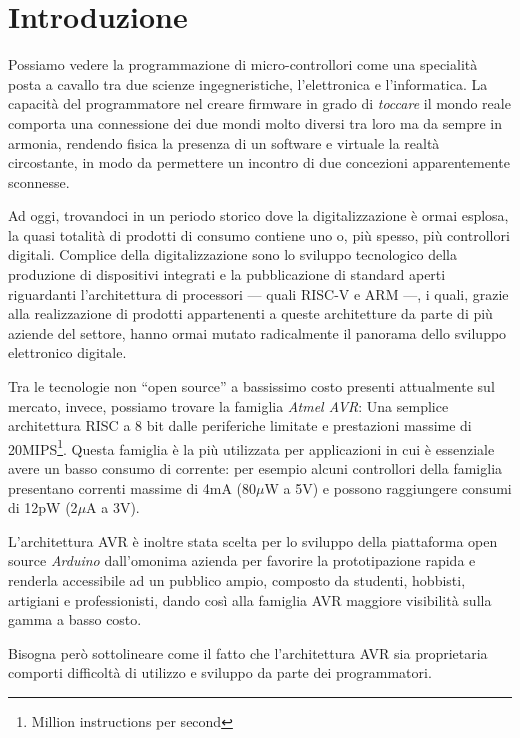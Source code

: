 \chapter{Introduzione}

Possiamo vedere la programmazione di micro-controllori come una specialità posta a cavallo tra due scienze ingegneristiche, l'elettronica e l'informatica.
La capacità del programmatore nel creare firmware in grado di \textit{toccare} il mondo reale comporta una connessione dei due mondi molto diversi tra loro ma da sempre in armonia, rendendo fisica la presenza di un software e virtuale la realtà circostante, in modo da permettere un incontro di due concezioni apparentemente sconnesse.

Ad oggi, trovandoci in un periodo storico dove la digitalizzazione è ormai esplosa, la quasi totalità di prodotti di consumo contiene uno o, più spesso, più controllori digitali.
Complice della digitalizzazione sono lo sviluppo tecnologico della produzione di dispositivi integrati e la pubblicazione di standard aperti riguardanti l'architettura di processori --- quali RISC-V e ARM\cite{site:arm-licensing} ---, i quali, grazie alla realizzazione di prodotti appartenenti a queste architetture da parte di più aziende del settore, hanno ormai mutato radicalmente il panorama dello sviluppo elettronico digitale.\cite{arm-intel-phone-market}\cite{site:arm-press-200b-chips}

Tra le tecnologie non ``open source'' a bassissimo costo presenti attualmente sul mercato, invece, possiamo trovare la famiglia \textit{Atmel AVR}: Una semplice architettura RISC a 8 bit dalle periferiche limitate e prestazioni massime di 20MIPS\footnote{Million instructions per second}.
Questa famiglia è la più utilizzata per applicazioni in cui è essenziale avere un basso consumo di corrente: per esempio alcuni controllori della famiglia presentano correnti massime di 4mA (80\(\mu\)W a 5V) e possono raggiungere consumi di 12pW (2\(\mu\)A a 3V)\cite{avr:tiny4}.

L'architettura AVR è inoltre stata scelta per lo sviluppo della piattaforma open source \textit{Arduino} dall'omonima azienda per favorire la prototipazione rapida e renderla accessibile ad un pubblico ampio, composto da studenti, hobbisti, artigiani e professionisti\cite{site:arduino-about}, dando così alla famiglia AVR maggiore visibilità sulla gamma a basso costo.

Bisogna però sottolineare come il fatto che l'architettura AVR sia proprietaria comporti difficoltà di utilizzo e sviluppo da parte dei programmatori.

